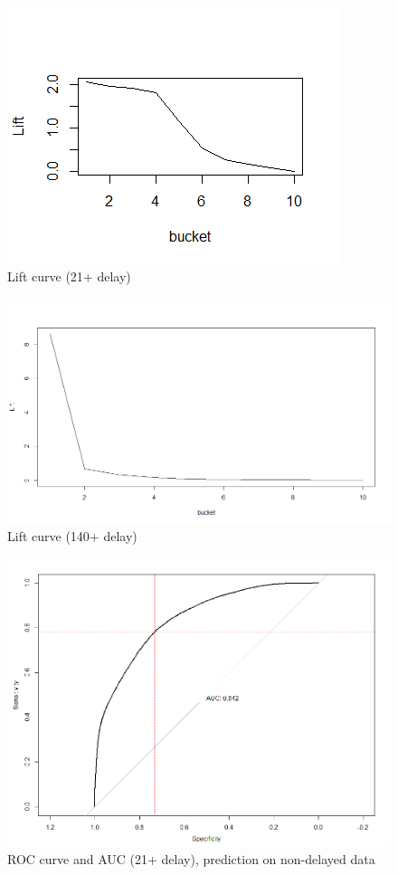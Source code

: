 \documentclass[
]{article}
\begin{document}
\begin{figure}
\centering
\includegraphics{.//lift21.png}
\caption{\label{fig:lift21} Lift curve (21+ delay)}
\end{figure}

\begin{figure}
\centering
\includegraphics{.//lift140.png}
\caption{\label{fig:lift140} Lift curve (140+ delay)}
\end{figure}

\begin{figure}
\centering
\includegraphics{.//filtered_21_AUC_roc.png}
\caption{\label{fig:filteredAUC21} ROC curve and AUC (21+ delay), prediction on non-delayed data}
\end{figure}
\end{document}
